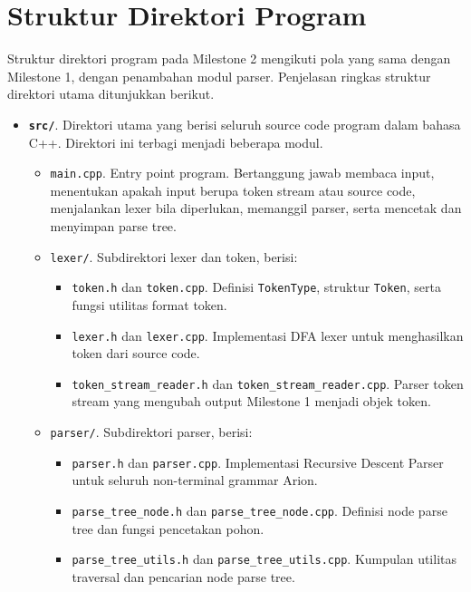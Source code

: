 \section{Struktur Direktori Program}
Struktur direktori program pada Milestone 2 mengikuti pola yang sama dengan Milestone 1, dengan penambahan modul parser. Penjelasan ringkas struktur direktori utama ditunjukkan berikut.

\begin{itemize}
	\item \textbf{\texttt{src/}}. Direktori utama yang berisi seluruh source code program dalam bahasa C++. Direktori ini terbagi menjadi beberapa modul.
		  \begin{itemize}
			  \item \texttt{main.cpp}. Entry point program. Bertanggung jawab membaca input, menentukan apakah input berupa token stream atau source code, menjalankan lexer bila diperlukan, memanggil parser, serta mencetak dan menyimpan parse tree.

			  \item \texttt{lexer/}. Subdirektori lexer dan token, berisi:
					\begin{itemize}
						\item \texttt{token.h} dan \texttt{token.cpp}. Definisi \texttt{TokenType}, struktur \texttt{Token}, serta fungsi utilitas format token.
						\item \texttt{lexer.h} dan \texttt{lexer.cpp}. Implementasi DFA lexer untuk menghasilkan token dari source code.
						\item \texttt{token\_stream\_reader.h} dan \texttt{token\_stream\_reader.cpp}. Parser token stream yang mengubah output Milestone 1 menjadi objek token.
					\end{itemize}

			  \item \texttt{parser/}. Subdirektori parser, berisi:
					\begin{itemize}
						\item \texttt{parser.h} dan \texttt{parser.cpp}. Implementasi Recursive Descent Parser untuk seluruh non-terminal grammar Arion.
						\item \texttt{parse\_tree\_node.h} dan \texttt{parse\_tree\_node.cpp}. Definisi node parse tree dan fungsi pencetakan pohon.
						\item \texttt{parse\_tree\_utils.h} dan \texttt{parse\_tree\_utils.cpp}. Kumpulan utilitas traversal dan pencarian node parse tree.
					\end{itemize}
		  \end{itemize}


\end{itemize}
